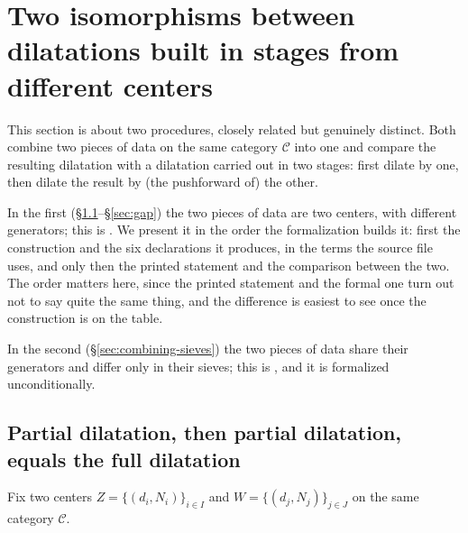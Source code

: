 \documentclass[11pt]{amsart}
\theoremstyle{plain}
\theoremstyle{definition}
\theoremstyle{remark}
\newcommand{\calC}{\mathcal C}
\begin{document}
\section{Two isomorphisms between dilatations built in stages from different centers}
\label{sec:combining}

This section is about two procedures, closely related but genuinely distinct. Both combine
two pieces of data on the same category $\calC$ into one and compare the resulting dilatation
with a dilatation carried out in two stages: first dilate by one, then dilate the result by
(the pushforward of) the other.

In the first (\S\ref{sec:combining-construction}--\S\ref{sec:gap}) the two pieces of data are
two centers, with different generators; this is \citep[Proposition~3.15]{Mayeux}. We present it
in the order the formalization builds it: first the construction and the six declarations it
produces, in the terms the source file uses, and only then the printed statement and the
comparison between the two. The order matters here, since the printed statement and the formal
one turn out not to say quite the same thing, and the difference is easiest to see once the
construction is on the table.

In the second (\S\ref{sec:combining-sieves}) the two pieces of data share their generators and
differ only in their sieves; this is \citep[Proposition~3.18]{Mayeux}, and it is formalized
unconditionally.

\subsection{Partial dilatation, then partial dilatation, equals the full dilatation}
\label{sec:combining-construction}

Fix two centers $Z = \{(d_i,N_i)\}_{i\in I}$ and $W = \{(d_j,N_j)\}_{j\in J}$ on the same
category $\calC$.
\end{document}
